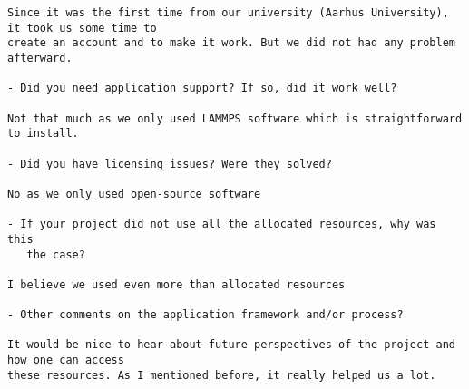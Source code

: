 {\begin{verbatim}
Since it was the first time from our university (Aarhus University), it took us some time to
create an account and to make it work. But we did not had any problem afterward.

- Did you need application support? If so, did it work well?

Not that much as we only used LAMMPS software which is straightforward to install. 

- Did you have licensing issues? Were they solved?

No as we only used open-source software

- If your project did not use all the allocated resources, why was this
   the case?

I believe we used even more than allocated resources

- Other comments on the application framework and/or process?

It would be nice to hear about future perspectives of the project and how one can access 
these resources. As I mentioned before, it really helped us a lot.
\end{verbatim}
}

